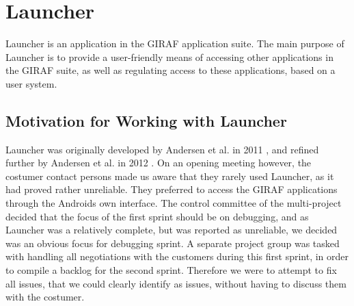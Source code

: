\section{Launcher}
Launcher is an application in the GIRAF application suite.
The main purpose of Launcher is to provide a user-friendly means of accessing other applications in the GIRAF suite, as well as regulating access to these applications, based on a user system.

\subsection{Motivation for Working with Launcher}
Launcher was originally developed by Andersen et al. in 2011 \cite{launcher2011}, and refined further by Andersen et al. in 2012 \cite{launcher2012}.
On an opening meeting however, the costumer contact persons made us aware that they rarely used Launcher, as it had proved rather unreliable. 
They preferred to access the GIRAF applications through the Androids own interface.
The control committee of the multi-project decided that the focus of the first sprint should be on debugging, and as Launcher was a relatively complete, but was reported as unreliable, we decided was an obvious focus for debugging sprint. 
A separate project group was tasked with handling all negotiations with the customers during this first sprint, in order to compile a backlog for the second sprint.
Therefore we were to attempt to fix all issues, that we could clearly identify as issues, without having to discuss them with the costumer.

